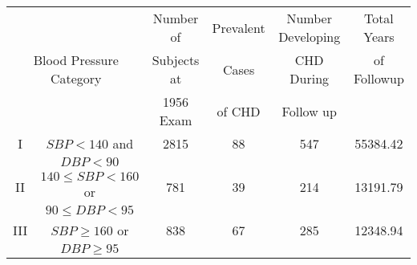 \documentclass{article}
\begin{document}
\begin{table}[ht]
\begin{center}
\begin{tabular}{cccccc}
  \hline
 &                                           & Number of  & Prevalent & Number Developing  & Total Years  \\ 
 \multicolumn{2}{c}{Blood Pressure Category} &Subjects at &  Cases    & CHD During         & of Followup\\
 &                                           &1956 Exam   &  of CHD   & Follow up          & \\
  \hline
I    &  \(SBP < 140\) and          & 2815 & 88 & 547 & 55384.42 \\
     &  \(DBP < 90\)               &      &    &     &          \\ 
II   &  \(140 \leq SBP < 160\) or  & 781  & 39 & 214 & 13191.79 \\ 
     &  \(90 \leq DBP < 95\)       &      &    &                \\
III  &  \(SBP \geq 160 \) or       & 838  & 67 & 285 & 12348.94 \\ 
     &  \(DBP \geq 95\)            &      &    &     &          \\
  \hline
\end{tabular}
\end{center}
\end{table}
\end{document}
